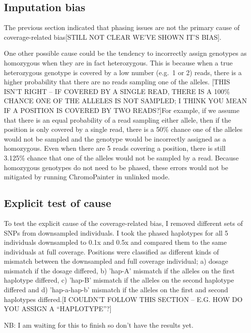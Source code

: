 \subsection{Imputation bias}

The previous section indicated that phasing issues are {\color{red}not} the primary cause of {\color{red}coverage-related bias[STILL NOT CLEAR WE'VE SHOWN IT'S BIAS]}.

One other possible cause could be the tendency to incorrectly assign genotypes as homozygous when they are in fact heterozygous. This is because when a true heterozygous genotype is covered by a low number (e.g.\ 1 or 2) reads, there is a higher probability that there are no reads sampling one of the alleles. {\color{red}[THIS ISN'T RIGHT -- IF COVERED BY A SINGLE READ, THERE IS A 100\% CHANCE ONE OF THE ALLELES IS NOT SAMPLED; I THINK YOU MEAN IF A POSITION IS COVERED BY TWO READS?]For example, if we assume that there is an equal probability of a read sampling either allele, then if the position is only covered by a single read, there is a 50\% chance one of the alleles would not be sampled and the genotype would be incorrectly assigned as a homozygous.} Even when there are 5 reads covering a position, there is still 3.125\% chance that one of the alleles would not be sampled by a read. Because homozygous genotypes do not need to be phased, these errors would not be mitigated by running ChromoPainter in unlinked mode.

\subsection{Explicit test of cause}

To test the explicit cause of the coverage-related bias, I removed different sets of SNPs from downsampled individuals. I took the phased haplotypes for all 5 individuals downsampled to 0.1x and 0.5x and compared them to the same individuals at full coverage. Positions were classified as different kinds of mismatch between the downsampled and full coverage individual; a) dosage mismatch if the dosage differed, b) 'hap-A' mismatch if the alleles on the first haplotype differed, c) 'hap-B' mismatch if the alleles on the second haplotype differed and d) 'hap-a-hap-b' mismatch if the alleles on the first and second haplotypes differed.{\color{red}[I COULDN'T FOLLOW THIS SECTION -- E.G. HOW DO YOU ASSIGN A ``HAPLOTYPE''?]} 

NB: I am waiting for this to finish so don't have the results yet. 


